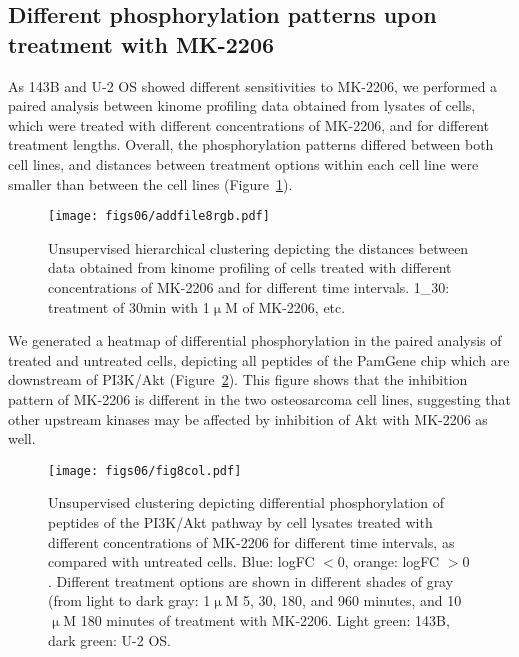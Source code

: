 \subsection{Different phosphorylation patterns upon treatment with MK-2206}
As 143B and U-2 OS showed different sensitivities to MK-2206, we performed a paired analysis between kinome profiling data obtained from lysates of cells, which were treated with different concentrations of MK-2206, and for different treatment lengths. Overall, the phosphorylation patterns differed between both cell lines, and distances between treatment options within each cell line were smaller than between the cell lines (Figure~\ref{afig6.8}).
%
\begin{figure}[htbp]
  \centering
  \begin{minipage}[b]{0.65\linewidth}
    \texttt{[image: figs06/addfile8rgb.pdf]}		%
  \end{minipage}
    \hfill
  \begin{minipage}[b]{0.31\linewidth}
     \caption{Unsupervised hierarchical clustering depicting the distances between data obtained from kinome profiling of cells treated with different concentrations of MK-2206 and for different time intervals. 1\_30: treatment of 30min with 1$\upmu$M of MK-2206, etc.} %
     \label{afig6.8}
     \end{minipage}
\end{figure}
%
We generated a heatmap of differential phosphorylation in the paired analysis of treated and untreated cells, depicting all peptides of the PamGene chip which are downstream of PI3K/Akt (Figure~\ref{fig6.8}). This figure shows that the inhibition pattern of MK-2206 is different in the two osteosarcoma cell lines, suggesting that other upstream kinases may be affected by inhibition of Akt with MK-2206 as well.
%
\begin{figure}[htbp]
	\centering
	\texttt{[image: figs06/fig8col.pdf]}	%
	\caption{Unsupervised clustering depicting differential phosphorylation of peptides of the PI3K/Akt pathway by cell lysates treated with different concentrations of MK-2206 for different time intervals, as compared with untreated cells. Blue: logFC $<0$, orange: logFC $>0$. Different treatment options are shown in different shades of gray (from light to dark gray: 1$\upmu$M 5, 30, 180, and 960 minutes, and 10$\upmu$M 180 minutes of treatment with MK-2206. Light green: 143B, dark green: U-2 OS.}
	\label{fig6.8}
\end{figure}
%

